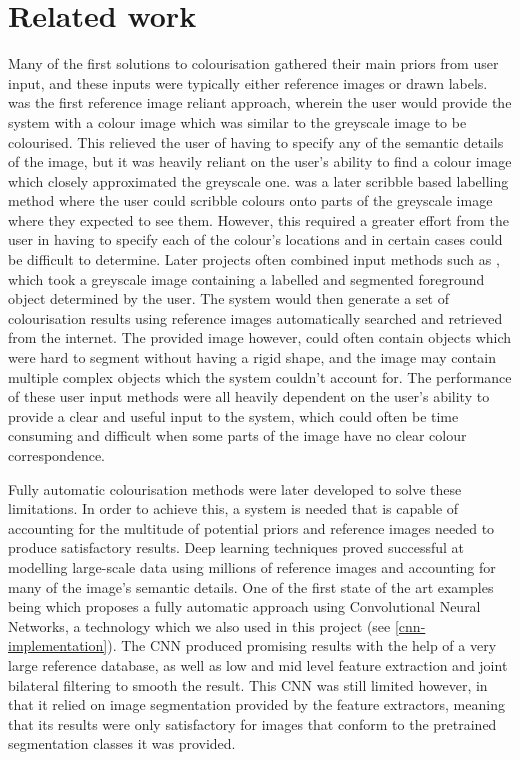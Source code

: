 \documentclass{l4proj}
\begin{document}
\section{Related work}
Many of the first solutions to colourisation gathered their main priors from user input, and these inputs were typically either reference images or drawn labels. \cite{TransferringColor} was the first reference image reliant approach, wherein the user would provide the system with a colour image which was similar to the greyscale image to be colourised. This relieved the user of having to specify any of the semantic details of the image, but it was heavily reliant on the user's ability to find a colour image which closely approximated the greyscale one. \cite{ColorizationOptimization} was a later scribble based labelling method where the user could scribble colours onto parts of the greyscale image where they expected to see them. However, this required a greater effort from the user in having to specify each of the colour's locations and in certain cases could be difficult to determine. Later projects often combined input methods such as \cite{SemanticColorization}, which took a greyscale image containing a labelled and segmented foreground object determined by the user. The system would then generate a set of colourisation results using reference images automatically searched and retrieved from the internet. The provided image however, could often contain objects which were hard to segment without having a rigid shape, and the image may contain multiple complex objects which the system couldn't account for. The performance of these user input methods were all heavily dependent on the user's ability to provide a clear and useful input to the system, which could often be time consuming and difficult when some parts of the image have no clear colour correspondence.

Fully automatic colourisation methods were later developed to solve these limitations. In order to achieve this, a system is needed that is capable of accounting for the multitude of potential priors and reference images needed to produce satisfactory results. Deep learning techniques proved successful at modelling large-scale data using millions of reference images and accounting for many of the image's semantic details. One of the first state of the art examples being \cite{DeepColorization} which proposes a fully automatic approach using Convolutional Neural Networks, a technology which we also used in this project (see \ref{cnn-implementation}). The CNN produced promising results with the help of a very large reference database, as well as low and mid level feature extraction and joint bilateral filtering to smooth the result. This CNN was still limited however, in that it relied on image segmentation provided by the feature extractors, meaning that its results were only satisfactory for images that conform to the pretrained segmentation classes it was provided. 
\end{document}
